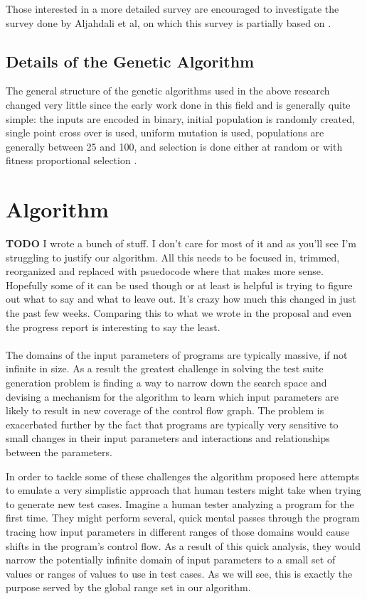 \documentclass[runningheads]{llncs}
\begin{document}
Those interested in a more detailed survey are encouraged to investigate the survey done by Aljahdali et al, on which this survey is partially based on \cite{limits6}.

\subsection{Details of the Genetic Algorithm}
The general structure of the genetic algorithms used in the above research changed very little since the early work done in this field and is generally quite simple: the inputs are encoded in binary, initial population is randomly created, single point cross over is used, uniform mutation is used, populations are generally between 25 and 100, and selection is done either at random or with fitness proportional selection \cite{sthammer4}\cite{apps5}\cite{limits6}\cite{sthammer7}\cite{pargas8}. 

\newpage

\newpage
\section{Algorithm}

\textbf{TODO} I wrote a bunch of stuff. I don't care for most of it and as you'll see I'm struggling to justify our algorithm. All this needs to be focused in, trimmed, reorganized and replaced with psuedocode where that makes more sense. Hopefully some of it can be used though or at least is helpful is trying to figure out what to say and what to leave out. It's crazy how much this changed in just the past few weeks. Comparing this to what we wrote in the proposal and even the progress report is interesting to say the least.
\\\\
The domains of the input parameters of programs are typically massive, if not infinite in size. As a result the greatest challenge in solving the test suite generation problem is finding a way to narrow down the search space and devising a mechanism for the algorithm to learn which input parameters are likely to result in new coverage of the control flow graph. The problem is exacerbated further by the fact that programs are typically very sensitive to small changes in their input parameters and interactions and relationships between the parameters. 

In order to tackle some of these challenges the algorithm proposed here attempts to emulate a very simplistic approach that human testers might take when trying to generate new test cases. Imagine a human tester analyzing a program for the first time. They might perform several, quick mental passes through the program tracing how input parameters in different ranges of those domains would cause shifts in the program's control flow. As a result of this quick analysis, they would narrow the potentially infinite domain of input parameters to a small set of values or ranges of values to use in test cases. As we will see, this is exactly the purpose served by the global range set in our algorithm.
\end{document}
